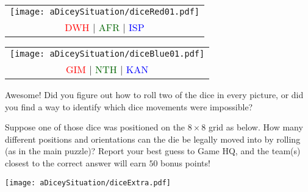 \begin{puzzle}
  \vfill


  \begin{center}
    \begin{tabular}{c}
      \texttt{[image: aDiceySituation/diceRed01.pdf]}
      \\
      \textcolor{red}{DWH} |
      \textcolor{darkGreen}{AFR} |
      \textcolor{blue}{ISP}
    \end{tabular}
  \end{center}


  \vfill


  \begin{center}
    \begin{tabular}{c}
      \texttt{[image: aDiceySituation/diceBlue01.pdf]}
      \\
      \textcolor{red}{GIM} |
      \textcolor{darkGreen}{NTH} |
      \textcolor{blue}{KAN}
    \end{tabular}
  \end{center}

\end{puzzle}

\begin{extraPuzzle}
  Awesome! Did you figure out how to roll two of the dice in every picture,
  or did you find a way to identify which dice movements were impossible?

  Suppose one of those dice was positioned on the \(8\times 8\) grid
  as below. How many different positions and orientations can the die
  be legally moved into by rolling (as in the main puzzle)?
  Report your best guess to Game HQ, and the team(s)
  closest to the correct answer will earn \(50\) bonus points!

  \begin{center}
  \texttt{[image: aDiceySituation/diceExtra.pdf]}
  \end{center}
\end{extraPuzzle}